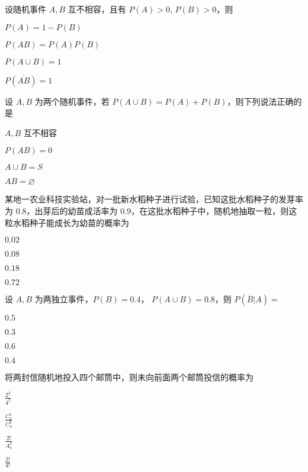 \documentclass{exam-zh}
\begin{document}
\begin{question}
  设随机事件 $A, B$ 互不相容，且有 $P(A) > 0$, $P(B) > 0$，则 \paren[D]
  \begin{choices}
    \item $P(A) = 1 - P(B)$  
    \item $P(AB) = P(A)P(B)$  
    \item $P(A \cup B) = 1$  
    \item $P(\overline{AB}) = 1$  
  \end{choices}
\end{question}

\begin{question}
  设 $A, B$ 为两个随机事件，若  
  $P(A \cup B) = P(A) + P(B)$，则下列说法正确的是 \paren[B]
  \begin{choices}
    \item $A, B$ 互不相容  
    \item $P(AB) = 0$  
    \item $A \cup B = S$  
    \item $AB = \diameter$  
  \end{choices}
\end{question}

\begin{question}
  某地一农业科技实验站，对一批新水稻种子进行试验，已知这批水稻种子的发芽率为 $0.8$，出芽后的幼苗成活率为 $0.9$，在这批水稻种子中，随机地抽取一粒，则这粒水稻种子能成长为幼苗的概率为 \paren[D]
  \begin{choices}
    \item $0.02$  
    \item $0.08$  
    \item $0.18$  
    \item $0.72$  
  \end{choices}
\end{question}

\begin{question}
  设 $A, B$ 为两独立事件，$P(B) = 0.4$，  
  $P(A \cup B) = 0.8$，则 $P(\overline{B} | A) =$ \paren[C]
  \begin{choices}
    \item $0.5$  
    \item $0.3$  
    \item $0.6$  
    \item $0.4$  
  \end{choices}
\end{question}

\begin{question}
  将两封信随机地投入四个邮筒中，则未向前面两个邮筒投信的概率为 \paren[A]
  \begin{choices}
    \item $\frac{2^2}{4^2}$  
    \item $\frac{C_2^1}{C_4^2}$  
    \item $\frac{2!}{A_4^2}$  
    \item $\frac{2!}{4!}$  
  \end{choices}
\end{question}
\end{document}
